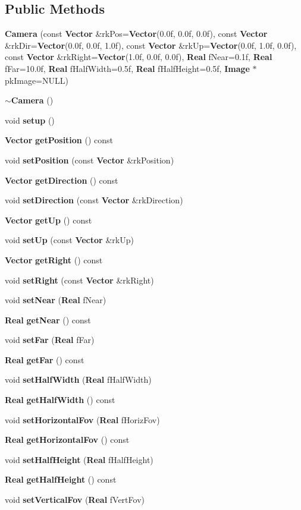 \subsection*{Public Methods}
\begin{CompactItemize}
\item 
{\bf Camera} (const {\bf Vector} \&rk\-Pos={\bf Vector}(0.0f, 0.0f, 0.0f), const {\bf Vector} \&rk\-Dir={\bf Vector}(0.0f, 0.0f, 1.0f), const {\bf Vector} \&rk\-Up={\bf Vector}(0.0f, 1.0f, 0.0f), const {\bf Vector} \&rk\-Right={\bf Vector}(1.0f, 0.0f, 0.0f), {\bf Real} f\-Near=0.1f, {\bf Real} f\-Far=10.0f, {\bf Real} f\-Half\-Width=0.5f, {\bf Real} f\-Half\-Height=0.5f, {\bf Image} $\ast$pk\-Image=NULL)
\item 
{\bf $\sim$Camera} ()
\item 
void {\bf setup} ()
\item 
{\bf Vector} {\bf get\-Position} () const
\item 
void {\bf set\-Position} (const {\bf Vector} \&rk\-Position)
\item 
{\bf Vector} {\bf get\-Direction} () const
\item 
void {\bf set\-Direction} (const {\bf Vector} \&rk\-Direction)
\item 
{\bf Vector} {\bf get\-Up} () const
\item 
void {\bf set\-Up} (const {\bf Vector} \&rk\-Up)
\item 
{\bf Vector} {\bf get\-Right} () const
\item 
void {\bf set\-Right} (const {\bf Vector} \&rk\-Right)
\item 
void {\bf set\-Near} ({\bf Real} f\-Near)
\item 
{\bf Real} {\bf get\-Near} () const
\item 
void {\bf set\-Far} ({\bf Real} f\-Far)
\item 
{\bf Real} {\bf get\-Far} () const
\item 
void {\bf set\-Half\-Width} ({\bf Real} f\-Half\-Width)
\item 
{\bf Real} {\bf get\-Half\-Width} () const
\item 
void {\bf set\-Horizontal\-Fov} ({\bf Real} f\-Horiz\-Fov)
\item 
{\bf Real} {\bf get\-Horizontal\-Fov} () const
\item 
void {\bf set\-Half\-Height} ({\bf Real} f\-Half\-Height)
\item 
{\bf Real} {\bf get\-Half\-Height} () const
\item 
void {\bf set\-Vertical\-Fov} ({\bf Real} f\-Vert\-Fov)

\end{CompactItemize}
